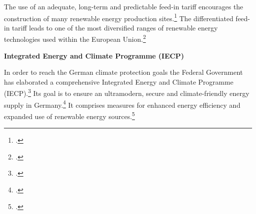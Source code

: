 The use of an adequate, long-term and predictable feed-in tariff encourages the construction of many renewable energy production sites.\footcite[][]{GermanyTariff}
The differentiated feed-in tariff leads to one of the most diversified ranges of renewable energy technologies used within the European Union.\footcite[][]{GermanyTariff}



\textbf{Integrated Energy and Climate Programme (IECP)}



In order to reach the German climate protection goals the Federal Government has elaborated a comprehensive Integrated Energy and Climate Programme (IECP).\footcite[][]{GermanyIECP}
Its goal is to ensure an ultramodern, secure and climate-friendly energy supply in Germany.\footcite[][]{GermanyIECP}
It comprises measures for enhanced energy efficiency and expanded use of renewable energy sources.\footcite[][]{GermanyIECP}



